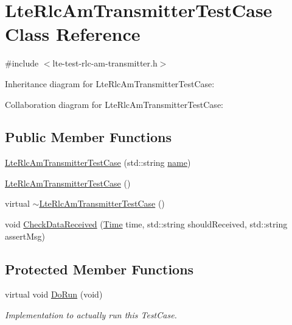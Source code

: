 \hypertarget{classLteRlcAmTransmitterTestCase}{}\section{Lte\+Rlc\+Am\+Transmitter\+Test\+Case Class Reference}
\label{classLteRlcAmTransmitterTestCase}


{\ttfamily \#include $<$lte-\/test-\/rlc-\/am-\/transmitter.\+h$>$}



Inheritance diagram for Lte\+Rlc\+Am\+Transmitter\+Test\+Case\+:


Collaboration diagram for Lte\+Rlc\+Am\+Transmitter\+Test\+Case\+:
\subsection*{Public Member Functions}
\begin{DoxyCompactItemize}
\item 
\hyperlink{classLteRlcAmTransmitterTestCase_a3ba9059d8da4916b445c3c480bb49267}{Lte\+Rlc\+Am\+Transmitter\+Test\+Case} (std\+::string \hyperlink{generate__test__data__lte__spectrum__model_8m_ab74e6bf80237ddc4109968cedc58c151}{name})
\item 
\hyperlink{classLteRlcAmTransmitterTestCase_af2ef61a2e61bf2166b865a7bf4917339}{Lte\+Rlc\+Am\+Transmitter\+Test\+Case} ()
\item 
virtual \hyperlink{classLteRlcAmTransmitterTestCase_a4b3683451ddae4d15ae593d56c5de1c7}{$\sim$\+Lte\+Rlc\+Am\+Transmitter\+Test\+Case} ()
\item 
void \hyperlink{classLteRlcAmTransmitterTestCase_a5cc6b6ad30c74a923b417ecac909ffbc}{Check\+Data\+Received} (\hyperlink{classns3_1_1Time}{Time} time, std\+::string should\+Received, std\+::string assert\+Msg)
\end{DoxyCompactItemize}
\subsection*{Protected Member Functions}
\begin{DoxyCompactItemize}
\item 
virtual void \hyperlink{classLteRlcAmTransmitterTestCase_a2d68ba91ebca75e75efb88365f958d2c}{Do\+Run} (void)
\begin{DoxyCompactList}\small\item\em Implementation to actually run this Test\+Case. \end{DoxyCompactList}\end{DoxyCompactItemize}
